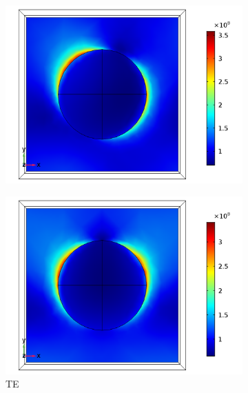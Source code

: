 \begin{figure}[htb!]
    \begin{subfigure}{0.32\textwidth}
        \centering
        \includegraphics[width=\linewidth]{figures/ch4/S5A/FieldDistribution/phi0-90/Sample5A_TE_Slice@z=0_wl=350_phi=65.png}
   \end{subfigure}
   \begin{subfigure}{0.32\textwidth}
        \centering
        \includegraphics[width=\linewidth]{figures/ch4/S5A/FieldDistribution/phi0-90/Sample5A_TE_Slice@z=0_wl=350_phi=90.png}
        \caption{TE}
        \vspace{-0.7cm}
   \end{subfigure}
   \begin{subfigure}{0.32\textwidth}

\end{subfigure}
\end{figure}
